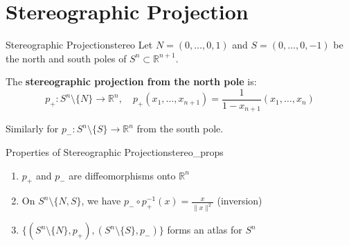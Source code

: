 \documentclass[11pt, letterpaper, openany]{book}
\begin{document}
\section{Stereographic Projection}

\begin{defn}{Stereographic Projection}{stereo}
Let $N = (0, \ldots, 0, 1)$ and $S = (0, \ldots, 0, -1)$ be the north and south poles of $S^n \subset \mathbb{R}^{n+1}$.

The \textbf{stereographic projection from the north pole} is:
\[p_+: S^n \setminus \{N\} \to \mathbb{R}^n, \quad p_+(x_1, \ldots, x_{n+1}) = \frac{1}{1 - x_{n+1}}(x_1, \ldots, x_n)\]

Similarly for $p_-: S^n \setminus \{S\} \to \mathbb{R}^n$ from the south pole.
\end{defn}

\begin{center}
\end{center}

\begin{thm}{Properties of Stereographic Projection}{stereo_props}
\begin{enumerate}
    \item $p_+$ and $p_-$ are diffeomorphisms onto $\mathbb{R}^n$
    \item On $S^n \setminus \{N, S\}$, we have $p_- \circ p_+^{-1}(x) = \frac{x}{\|x\|^2}$ (inversion)
    \item $\{(S^n \setminus \{N\}, p_+), (S^n \setminus \{S\}, p_-)\}$ forms an atlas for $S^n$
\end{enumerate}
\end{thm}
\end{document}
